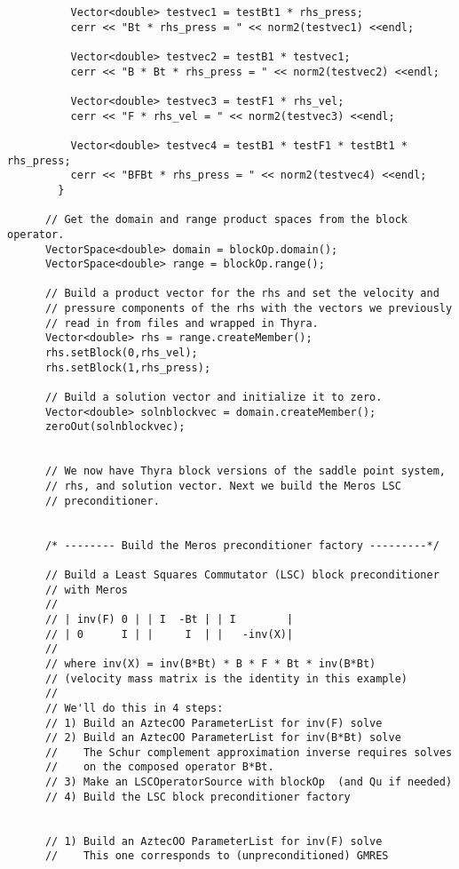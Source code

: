 \begin{verbatim}
          Vector<double> testvec1 = testBt1 * rhs_press;
          cerr << "Bt * rhs_press = " << norm2(testvec1) <<endl;
	  
          Vector<double> testvec2 = testB1 * testvec1;
          cerr << "B * Bt * rhs_press = " << norm2(testvec2) <<endl;
	  
          Vector<double> testvec3 = testF1 * rhs_vel;
          cerr << "F * rhs_vel = " << norm2(testvec3) <<endl;
	  
          Vector<double> testvec4 = testB1 * testF1 * testBt1 * rhs_press;
          cerr << "BFBt * rhs_press = " << norm2(testvec4) <<endl;
        }

      // Get the domain and range product spaces from the block operator. 
      VectorSpace<double> domain = blockOp.domain();
      VectorSpace<double> range = blockOp.range();

      // Build a product vector for the rhs and set the velocity and
      // pressure components of the rhs with the vectors we previously
      // read in from files and wrapped in Thyra.
      Vector<double> rhs = range.createMember();
      rhs.setBlock(0,rhs_vel);
      rhs.setBlock(1,rhs_press);

      // Build a solution vector and initialize it to zero.
      Vector<double> solnblockvec = domain.createMember();
      zeroOut(solnblockvec);


      // We now have Thyra block versions of the saddle point system,
      // rhs, and solution vector. Next we build the Meros LSC
      // preconditioner.


      /* -------- Build the Meros preconditioner factory ---------*/

      // Build a Least Squares Commutator (LSC) block preconditioner
      // with Meros
      // 
      // | inv(F) 0 | | I  -Bt | | I        |
      // | 0      I | |     I  | |   -inv(X)|
      // 
      // where inv(X) = inv(B*Bt) * B * F * Bt * inv(B*Bt)
      // (velocity mass matrix is the identity in this example)
      //
      // We'll do this in 4 steps:
      // 1) Build an AztecOO ParameterList for inv(F) solve
      // 2) Build an AztecOO ParameterList for inv(B*Bt) solve
      //    The Schur complement approximation inverse requires solves
      //    on the composed operator B*Bt.
      // 3) Make an LSCOperatorSource with blockOp  (and Qu if needed)
      // 4) Build the LSC block preconditioner factory 


      // 1) Build an AztecOO ParameterList for inv(F) solve
      //    This one corresponds to (unpreconditioned) GMRES


\end{verbatim}
